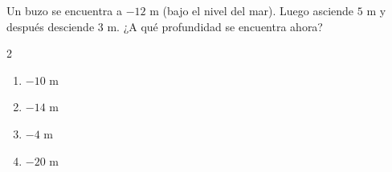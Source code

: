 Un buzo se encuentra a \(-12\) m (bajo el nivel del mar). Luego asciende \(5\) m y después desciende \(3\) m. ¿A qué profundidad se encuentra ahora?
\begin{multicols}{2}
\begin{enumerate}[label=\alph*)]
\item \(-10\) m
\item \(-14\) m
\item \(-4\) m
\item \(-20\) m
\end{enumerate}
\end{multicols}